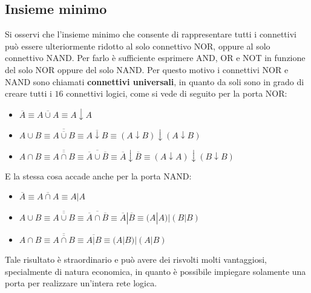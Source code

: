 \documentclass[a4paper]{extarticle}
\begin{document}
\subsection{Insieme minimo}
Si osservi che l’insieme minimo che consente di rappresentare tutti i connettivi può essere ulteriormente ridotto al solo connettivo NOR, oppure al solo connettivo NAND. Per farlo è sufficiente esprimere AND, OR e NOT in funzione del solo NOR oppure del solo NAND. Per questo motivo i connettivi NOR e NAND sono chiamati \textbf{connettivi universali}, in quanto da soli sono in grado di creare tutti i \(16\) connettivi logici, come si vede di seguito per la porta NOR:

\begin{itemize}
    \item \(\overline{A} \equiv \overline{A \cup A} \equiv A \downarrow A\)
    \item \(A \cup B \equiv \overline{\overline{A \cup B}} \equiv \overline{A \downarrow B} \equiv (A \downarrow B) \downarrow (A \downarrow B)\)
    \item \(A \cap B \equiv \overline{\overline{A \cap B}} \equiv \overline{\overline{A} \cup \overline{B}} \equiv \overline{A} \downarrow \overline{B} \equiv (A \downarrow A) \downarrow (B \downarrow B)\)
\end{itemize}
E la stessa cosa accade anche per la porta NAND:
\begin{itemize}
    \item \(\overline{A} \equiv \overline{A \cap A} \equiv A | A\)
    \item \(A \cup B \equiv \overline{\overline{A \cup B}} \equiv \overline{\overline{A} \cap \overline{B}} \equiv \overline{A} | \overline{B} \equiv (A | A) | (B | B)\)
    \item \(A \cap B \equiv \overline{\overline{A \cap B}} \equiv \overline{A \vert B} \equiv (A | B) | (A | B)\)
\end{itemize}

\noindent
Tale risultato è straordinario e può avere dei risvolti molti vantaggiosi, specialmente di natura economica, in quanto è possibile impiegare solamente una porta per realizzare un'intera rete logica.
\end{document}
